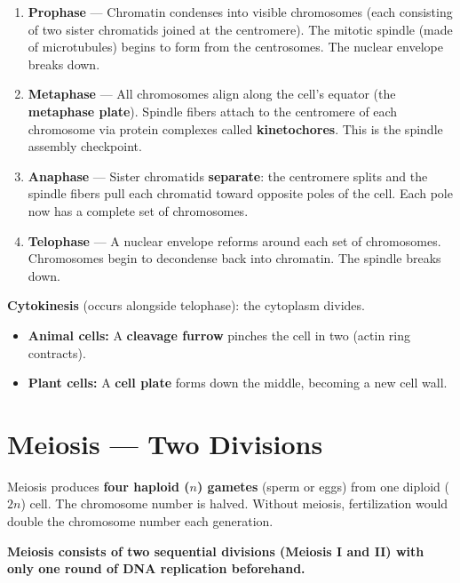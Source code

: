\documentclass[11pt, letterpaper]{article}
\begin{document}
\begin{tcolorbox}[colback=part5bg, colframe=sectionteal,
  title={\bfseries PMAT: The Four Stages of Mitosis}, arc=3pt, boxrule=1pt]
\begin{enumerate}[leftmargin=*, noitemsep]
  \item \textbf{Prophase} --- Chromatin condenses into visible chromosomes (each consisting of
        two sister chromatids joined at the centromere). The mitotic spindle (made of
        microtubules) begins to form from the centrosomes. The nuclear envelope breaks down.
  \item \textbf{Metaphase} --- All chromosomes align along the cell's equator (the
        \textbf{metaphase plate}). Spindle fibers attach to the centromere of each chromosome
        via protein complexes called \textbf{kinetochores}. This is the spindle assembly
        checkpoint.
  \item \textbf{Anaphase} --- Sister chromatids \textbf{separate}: the centromere splits and
        the spindle fibers pull each chromatid toward opposite poles of the cell. Each pole
        now has a complete set of chromosomes.
  \item \textbf{Telophase} --- A nuclear envelope reforms around each set of chromosomes.
        Chromosomes begin to decondense back into chromatin. The spindle breaks down.
\end{enumerate}
\textbf{Cytokinesis} (occurs alongside telophase): the cytoplasm divides.
\begin{itemize}[noitemsep, leftmargin=*]
  \item \textbf{Animal cells:} A \textbf{cleavage furrow} pinches the cell in two (actin ring contracts).
  \item \textbf{Plant cells:} A \textbf{cell plate} forms down the middle, becoming a new cell wall.
\end{itemize}
\end{tcolorbox}

\section*{Meiosis --- Two Divisions}

Meiosis produces \textbf{four haploid ($n$) gametes} (sperm or eggs) from one diploid ($2n$) cell.
The chromosome number is halved. Without meiosis, fertilization would double the chromosome
number each generation.

\textbf{Meiosis consists of two sequential divisions (Meiosis I and II) with only one round
of DNA replication beforehand.}
\end{document}
